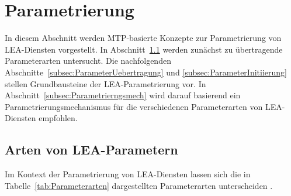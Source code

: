 \section{Parametrierung}
\label{sec:LeaParameter}

In diesem Abschnitt werden MTP-basierte Konzepte zur Parametrierung von LEA-Diensten vorgestellt. In Abschnitt~\ref{subsec:Parameterarten} werden zunächst zu übertragende Parameterarten untersucht. Die nachfolgenden Abschnitte~\ref{subsec:ParameterUebertragung} und \ref{subsec:ParameterInitiierung} stellen Grundbausteine der LEA-Parametrierung vor. In Abschnitt~\ref{subsec:Parametrierngsmech} wird darauf basierend ein Parametrierungsmechanismus für die verschiedenen Parameterarten von LEA-Diensten empfohlen. 

\subsection{Arten von LEA-Parametern}
\label{subsec:Parameterarten}

Im Kontext der Parametrierung von LEA-Diensten lassen sich die in Tabelle~\ref{tab:Parameterarten} dargestellten Parameterarten unterscheiden \cite{Blumenstein.atpLEA,Janzen.2023,Blumenstein.MoProLog}. 

